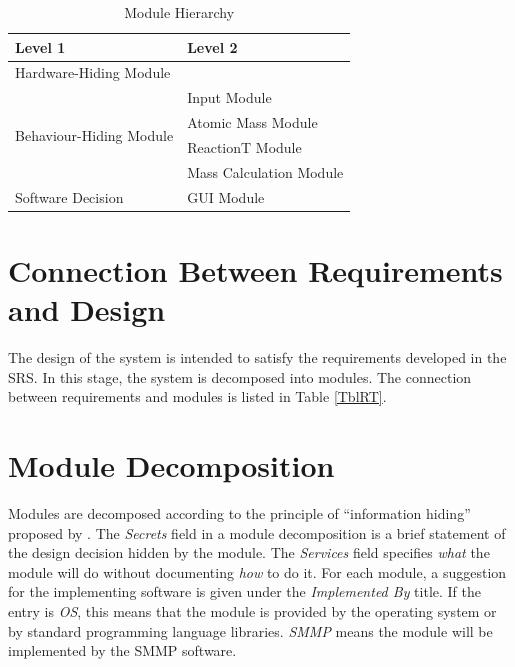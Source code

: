 \documentclass[12pt, titlepage]{article}
\begin{document}
\begin{table}[h!]
\centering
\begin{tabular}{p{} p{}}
\toprule
\textbf{Level 1} & \textbf{Level 2}\\
\midrule

{Hardware-Hiding Module} & ~ \\
\midrule

\multirow{4}{0.3\textwidth}{Behaviour-Hiding Module} &Input Module \\
& Atomic Mass Module\\
&ReactionT Module \\
& Mass Calculation Module\\

\midrule

\multirow{1}{0.3\textwidth}{Software Decision} &  GUI Module\\

\bottomrule

\end{tabular}
\caption{Module Hierarchy}
\label{TblMH}
\end{table}


\section{Connection Between Requirements and Design} \label{SecConnection}

The design of the system is intended to satisfy the requirements developed in
the SRS. In this stage, the system is decomposed into modules. The connection
between requirements and modules is listed in Table \ref{TblRT}.


\section{Module Decomposition} \label{SecMD}

Modules are decomposed according to the principle of ``information hiding''
proposed by \cite{ParnasEtAl1984}. The \emph{Secrets} field in a module
decomposition is a brief statement of the design decision hidden by the
module. The \emph{Services} field specifies \emph{what} the module will do
without documenting \emph{how} to do it. For each module, a suggestion for the
implementing software is given under the \emph{Implemented By} title. If the
entry is \emph{OS}, this means that the module is provided by the operating
system or by standard programming language libraries.  \emph{SMMP} means the
module will be implemented by the SMMP software.
\end{document}
